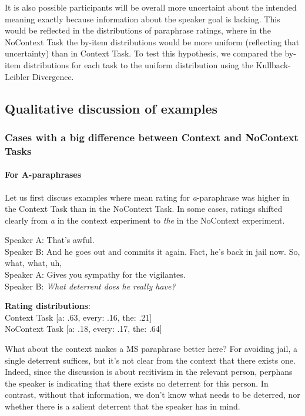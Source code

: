 \documentclass[12pt,letterpaper,table,svgnames,dvipsnames]{article}
\begin{document}
It is also possible participants will be overall more uncertaint about the intended meaning exactly because information about the speaker goal is lacking. This would be reflected in the distributions of paraphrase ratings, where in the NoContext Task the  by-item distributions would be more uniform (reflecting that uncertainty) than in Context Task. To test this hypothesis, we compared the by-item distributions for each task to the uniform distribution using the Kullback-Leibler Divergence.



\subsection{Qualitative discussion of examples}


\subsubsection{Cases with a big difference between Context and NoContext Tasks}


\paragraph{For A-paraphrases} Let us first discuss examples where mean rating for \emph{a}-paraphrase was higher in the Context Task than in the NoContext Task. In some cases, ratings shifted clearly from \emph{a} in the context experiment to \emph{the} in the NoContext experiment.
\begin{exe}
\ex {}
\begin{xlist}
    \ex {}
    Speaker A: That's awful.\\
    Speaker B: And he goes out and commits it again. Fact, he's back in jail now. So, what, what, uh,\\
    Speaker A: Gives you sympathy for the vigilantes.\\
    Speaker B: \emph{What deterrent does he really have?}
    
    \ex \textbf{Rating distributions}:\\
    Context Task [a: .63, every: .16, the: .21]\\
    NoContext Task [a: .18, every: .17, the: .64]
    \end{xlist}
\end{exe}
What about the context makes a MS paraphrase better here? For avoiding jail, a single deterrent suffices, but it's not clear from the context that there exists one. Indeed, since the discussion is about recitivism in the relevant person, perphans the speaker is indicating that there exists no deterrent for this person. In contrast, without that information, we don't know what needs to be deterred, nor whether there is a salient deterrent that the speaker has in mind.
\end{document}
